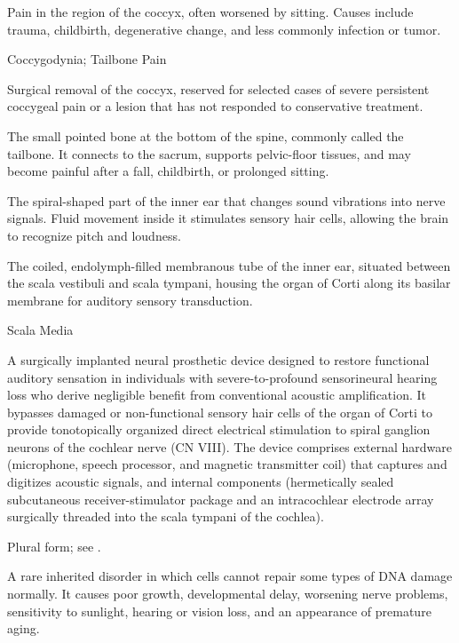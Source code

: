  Pain in the region of the coccyx, often worsened by sitting. Causes include trauma,
childbirth, degenerative change, and less commonly infection or tumor.

\synonyms
Coccygodynia; Tailbone Pain

 Surgical removal of the coccyx, reserved for selected cases of severe persistent
coccygeal pain or a lesion that has not responded to conservative treatment.

 The small pointed bone at the bottom of the spine, commonly called the tailbone. It connects to the sacrum, supports pelvic-floor tissues, and may become painful after a fall, childbirth, or prolonged sitting.

 The spiral-shaped part of the inner ear that changes sound vibrations into nerve signals. Fluid movement inside it stimulates sensory hair cells, allowing the brain to recognize pitch and loudness.

 The coiled, endolymph-filled membranous tube of the inner ear, situated between the scala vestibuli and scala tympani, housing the organ of Corti along its basilar membrane for auditory sensory transduction.

\synonyms
Scala Media

 A surgically implanted neural prosthetic device designed to restore functional auditory sensation in individuals with severe-to-profound sensorineural hearing loss who derive negligible benefit from conventional acoustic amplification. It bypasses damaged or non-functional sensory hair cells of the organ of Corti to provide tonotopically organized direct electrical stimulation to spiral ganglion neurons of the cochlear nerve (CN VIII). The device comprises external hardware (microphone, speech processor, and magnetic transmitter coil) that captures and digitizes acoustic signals, and internal components (hermetically sealed subcutaneous receiver-stimulator package and an intracochlear electrode array surgically threaded into the scala tympani of the cochlea).

 Plural form; see .

 A rare inherited disorder in which cells cannot repair some types of DNA damage normally. It causes poor growth, developmental delay, worsening nerve problems, sensitivity to sunlight, hearing or vision loss, and an appearance of premature aging.

